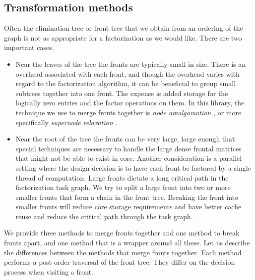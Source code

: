 \subsection{Transformation methods}
\label{subsection:ETree:proto:transformation}
Often the elimination tree or front tree that we obtain from an
ordering of the graph is not as appropriate for a factorization as
we would like.
There are two important cases.
\begin{itemize}
\item
Near the leaves of the tree the fronts are typically small in size.
There is an overhead associated with each front, and though the
overhead varies with regard to the factorization algorithm, it can
be beneficial to group small subtrees together into one front.
The expense is added storage for the logically zero entries and the
factor operations on them.
In this library, the technique we use to merge fronts together is 
{\it node amalgamation} \cite{duf83-multifrontal}, 
or more specifically {\it supernode relaxation} \cite{ash89-relaxed}.
\item
Near the root of the tree the fronts can be very large, large
enough that special techniques are necessary to handle the large
dense frontal matrices that might not be able to exist in-core.
Another consideration is a parallel setting where the design
decision is to have each front be factored by a single thread of
computation.
Large fronts dictate a long critical path in the factorization task
graph. 
We try to split a large front into two or more smaller fronts
that form a chain in the front tree.
Breaking the front into smaller fronts will reduce core storage
requirements and have better cache reuse and reduce the critical
path through the task graph.
\end{itemize}
We provide three methods to merge fronts together and one method to
break fronts apart, and one method that is a wrapper around all these.
Let us describe the differences between the methods that merge 
fronts together.
Each method performs a post-order traversal of the front tree.
They differ on the decision process when visiting a front.

